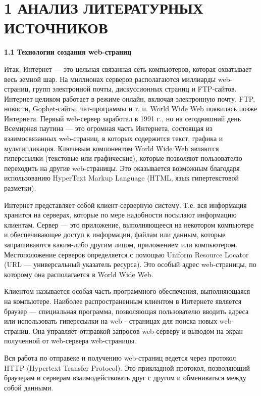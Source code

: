 \documentclass[14pt,a4paper]{extreport}
\begin{document}
	\newpage
	\section*{\normalsize\hspace{4ex}1 АНАЛИЗ ЛИТЕРАТУРНЫХ ИСТОЧНИКОВ}
	\textbf{1.1  Технологии создания web-страниц}

	\parindent=1cm Итак, Интернет — это цельная связанная сеть компьютеров, которая охватывает весь земной шар. На миллионах серверов располагаются миллиарды web-страниц, групп электронной почты, дискуссионных страниц и FTP-сайтов. Интернет целиком работает в режиме онлайн, включая электронную почту, FTP, новости, Gophet-сайты, чат-программы и т. п. World Wide Web появилась позже Интернета. Первый web-сервер заработал в 1991 г., но на сегодняшний день Всемирная паутина — это огромная часть Интернета, состоящая из взаимосвязанных web-страниц, в которых содержится текст, графика и мультипликация. Ключевым компонентом World Wide Web являются гиперссылки (текстовые или графические), которые позволяют пользователю переходить на другие web-страницы. Это оказывается возможным благодаря использованию HyperText Markup Language (HTML, язык гипертекстовой разметки).\par
	Интернет представляет собой клиент-серверную систему. Т.е. вся информация хранится на серверах, которые по мере надобности посылают информацию клиентам. Сервер — это приложение, выполняющееся на некотором компьютере и обеспечивающее доступ к информации, файлам или данным, которые запрашиваются каким-либо другим лицом, приложением или компьютером. Местоположение серверов определяется с помощью Uniform Resource Locator (URL — универсальный указатель ресурса). Это особый адрес web-страницы, по которому она располагается в World Wide Web.\par 		Клиентом называется особая часть программного обеспечения, выполняющаяся на компьютере. Наиболее распространенным клиентом в Интернете является браузер — специальная программа, позволяющая пользователю вводить адреса или использовать гиперссылки на web - страницах для поиска новых web-страниц. Она управляет отправкой запросов web-серверу и выводом на экран полученной от web-сервера web-страницы.\par
	Вся работа по отправеке и получению web-страниц ведется через протокол HTTP (Hypertext Transfer Protocol). Это прикладной протокол, позволяющий браузерам и серверам взаимодействовать друг с другом и обмениваться между собой данными.\par
\end{document}
